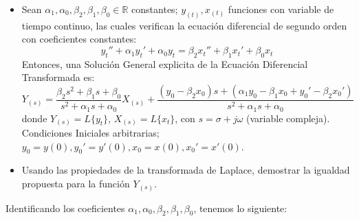\documentclass[12pt,a4paper]{report}
\begin{document}
\begin{enumerate}[label=\alph*)]
      \begin{itemize}
        \item Sean $\alpha_1, \alpha_0, \beta_2, \beta_1, \beta_0 \in \mathbb{R}$ constantes; $y_{(t)}, x_{(t)}$ funciones
          con variable de tiempo continuo, las cuales verifican la ecuación diferencial de segundo orden con coeficientes
          constantes:
          $$y_t'' + \alpha_1 y_t' + \alpha_0 y_t = \beta_2 x_t'' + \beta_1 x_t' + \beta_0 x_t$$
          Entonces, una Solución General explicita de la Ecuación Diferencial Transformada es:
          $$Y_{(s)} = \frac{\beta_2 s^2 + \beta_1 s + \beta_0}{s^2 + \alpha_1 s + \alpha_0}X_{(s)} + \frac{(y_0 - \beta_2 x_0)
            s + (\alpha_1 y_0 - \beta_1 x_0 + y_0' - \beta_2 x_0')}{s^2 + \alpha_1 s + \alpha_0}$$
          donde $Y_{(s)} = L\{y_t\}$, $X_{(s)} = L\{x_t\}$, con $s = \sigma + j \omega$ (variable compleja). Condiciones
          Iniciales arbitrarias; $y_0 = y(0), y_0' = y'(0), x_0 = x(0), x_0' = x'(0)$.
        \item Usando las propiedades de la transformada de Laplace, demostrar la igualdad propuesta para la función
        $Y_{(s)}$.
      \end{itemize}

      Identificando los coeficientes $\alpha_1, \alpha_0, \beta_2, \beta_1, \beta_0$, tenemos lo siguiente:


\end{enumerate}
\end{document}
